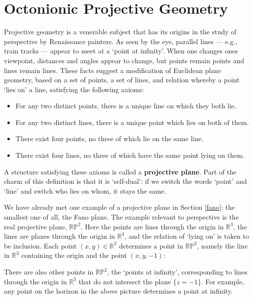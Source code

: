 \documentclass[12pt]{article}
\newcommand\R{{\mathbb R}}
\newcommand\RP{{\mathbb {RP}}}
\begin{document}
\section{Octonionic Projective Geometry}   \label{proj} 
 
Projective geometry is a venerable subject that has its origins in the 
study of perspective by Renaissance painters.  As seen by the eye, 
parallel lines --- e.g., train tracks --- appear to meet at a `point at 
infinity'.  When one changes ones viewpoint, distances and angles appear 
to change, but points remain points and lines remain lines.  These facts 
suggest a modification of Euclidean plane geometry, based on a set of 
points, a set of lines, and relation whereby a point `lies on' a line, 
satisfying the following axioms: 
\begin{itemize} 
\item For any two distinct points, there is a unique line on which they 
both lie. 
\item For any two distinct lines, there is a unique point which lies on 
both of them. 
\item There exist four points, no three of which lie on the same line. 
\item There exist four lines, no three of which have the same point lying 
on them.   
\end{itemize} 
A structure satisfying these axioms is called a {\bf projective plane}. 
Part of the charm of this definition is that it is `self-dual': if we 
switch the words `point' and `line' and switch who lies on whom, it 
stays the same.   
 
We have already met one example of a projective plane in Section  
\ref{fano}: the smallest one of all, the Fano plane.  The example 
relevant to perspective is the real projective plane, $\RP^2$.  Here the 
points are lines through the origin in $\R^3$, the lines are planes 
through the origin in $\R^3$, and the relation of `lying on' is taken to 
be inclusion.  Each point $(x,y) \in \R^2$ determines a point in 
$\RP^2$, namely the line in $\R^3$ containing the origin and the point 
$(x,y,-1)$:

\centerline{\epsfysize=2in}   
\label{plane}   

\noindent
There are also other points in $\RP^2$, the `points at infinity',
corresponding to lines through the origin in $\R^3$ that do not
intersect the plane $\{z = -1\}$.   For example, any point on the 
horizon in the above picture determines a point at infinity. 
 
\end{document}

